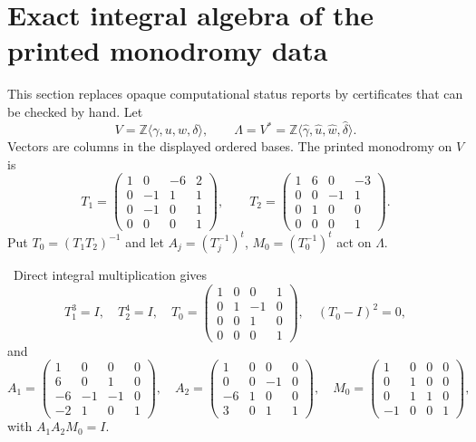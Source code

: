 \section{Exact integral algebra of the printed monodromy data}

This section replaces opaque computational status reports by certificates
that can be checked by hand.  Let
\[
 V=\mathbb Z\langle\gamma,u,w,\delta\rangle,\qquad
 \Lambda=V^*
 =\mathbb Z\langle\widehat\gamma,\widehat u,
                         \widehat w,\widehat\delta\rangle .
\]
Vectors are columns in the displayed ordered bases.  The printed monodromy on
$V$ is
\[
T_1=
\begin{pmatrix}
1&0&-6&2\\0&-1&1&1\\0&-1&0&1\\0&0&0&1
\end{pmatrix},
\qquad
T_2=
\begin{pmatrix}
1&6&0&-3\\0&0&-1&1\\0&1&0&0\\0&0&0&1
\end{pmatrix}.
\tag{3.1}
\]
Put $T_0=(T_1T_2)^{-1}$ and let
$A_j=(T_j^{-1})^t$, $M_0=(T_0^{-1})^t$ act on $\Lambda$.

\begin{proposition}\label{wb:prop:monodromy-certificate}
\ Direct integral multiplication gives
\[
T_1^3=I,\quad T_2^4=I,\quad
T_0=
\begin{pmatrix}
1&0&0&1\\0&1&-1&0\\0&0&1&0\\0&0&0&1
\end{pmatrix},
\quad (T_0-I)^2=0,
\]
and
\[
A_1=
\begin{pmatrix}
1&0&0&0\\6&0&1&0\\-6&-1&-1&0\\-2&1&0&1
\end{pmatrix},
\quad
A_2=
\begin{pmatrix}
1&0&0&0\\0&0&-1&0\\-6&1&0&0\\3&0&1&1
\end{pmatrix},
\quad
M_0=
\begin{pmatrix}
1&0&0&0\\0&1&0&0\\0&1&1&0\\-1&0&0&1
\end{pmatrix},
\]
with $A_1A_2M_0=I$.
\end{proposition}

